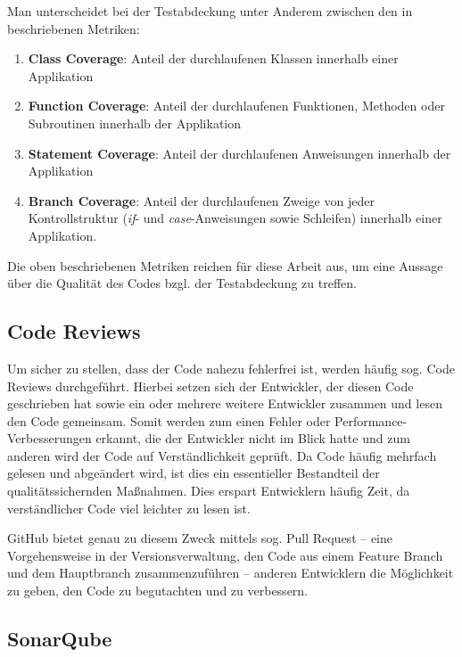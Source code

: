 				Man unterscheidet bei der Testabdeckung unter Anderem zwischen den in \cite{Myers.2004} beschriebenen Metriken:
				
				\begin{enumerate}
					\item 
						\textbf{Class Coverage}: Anteil der durchlaufenen Klassen innerhalb einer Applikation
					\item 	
						\textbf{Function Coverage}: Anteil der durchlaufenen Funktionen, Methoden oder Subroutinen innerhalb der Applikation
					\item 
						\textbf{Statement Coverage}: Anteil der durchlaufenen Anweisungen innerhalb der Applikation
					\item 
						\textbf{Branch Coverage}: Anteil der durchlaufenen Zweige von jeder Kontrollstruktur (\textit{if}- und \textit{case}-Anweisungen sowie Schleifen) innerhalb einer Applikation. 
				\end{enumerate}
			
				Die oben beschriebenen Metriken reichen für diese Arbeit aus, um eine Aussage über die Qualität des Codes bzgl. der Testabdeckung zu treffen. 
				
		\subsection{Code Reviews}
		
			Um sicher zu stellen, dass der Code nahezu fehlerfrei ist, werden häufig sog. Code Reviews durchgeführt. Hierbei setzen sich der Entwickler, der diesen Code geschrieben hat sowie ein oder mehrere weitere Entwickler zusammen und lesen den Code gemeinsam. Somit werden zum einen Fehler oder Performance-Verbesserungen erkannt, die der Entwickler nicht im Blick hatte und zum anderen wird der Code auf Verständlichkeit geprüft. Da Code häufig mehrfach gelesen und abgeändert wird, ist dies ein essentieller Bestandteil der qualitätssichernden Maßnahmen. Dies erspart Entwicklern häufig Zeit, da verständlicher Code viel leichter zu lesen ist.
			
			GitHub bietet genau zu diesem Zweck mittels sog. Pull Request -- eine Vorgehensweise in der Versionsverwaltung, den Code aus einem Feature Branch und dem Hauptbranch zusammenzuführen -- anderen Entwicklern die Möglichkeit zu geben, den Code zu begutachten und zu verbessern.			
		
		\subsection{SonarQube}
		\label{qm.sonarqube}
		
